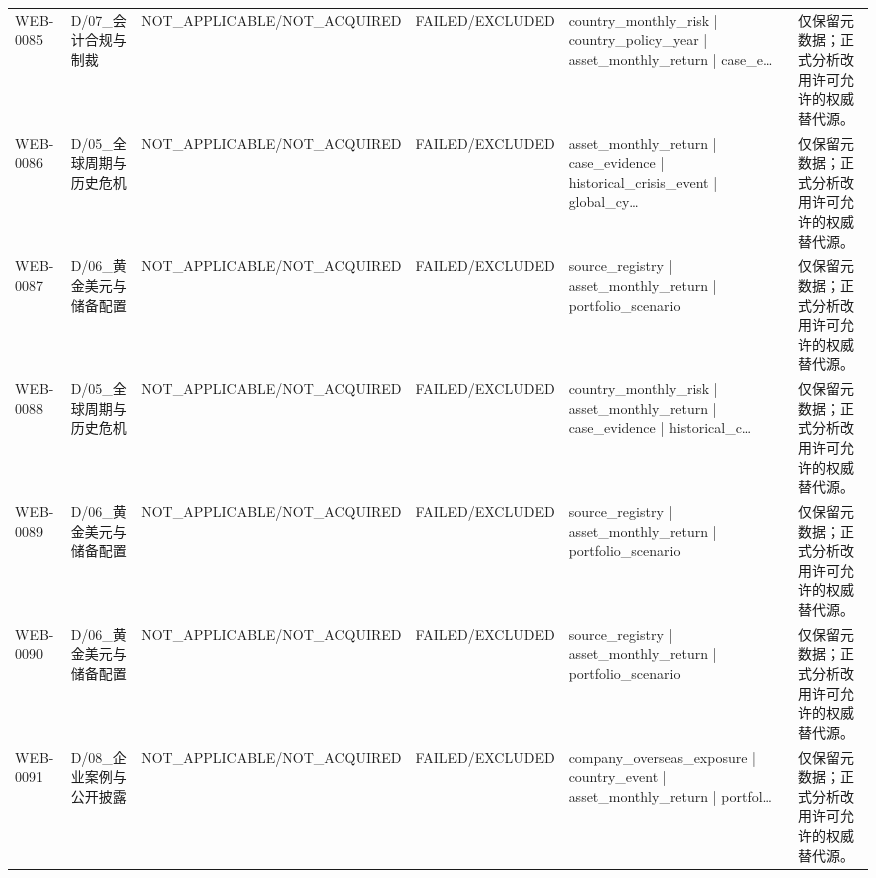 \begin{landscape}
\begin{longtable}{p{1.8cm}p{2.6cm}p{2.6cm}p{2.6cm}p{4.8cm}p{7.2cm}}
WEB-0085 & D/\allowbreak{}07\_\allowbreak{}会计合规与制裁 & NOT\_\allowbreak{}APPLICABLE/\allowbreak{}NOT\_\allowbreak{}ACQUIRED & FAILED/\allowbreak{}EXCLUDED & country\_\allowbreak{}monthly\_\allowbreak{}risk | country\_\allowbreak{}policy\_\allowbreak{}year | asset\_\allowbreak{}monthly\_\allowbreak{}return | case\_\allowbreak{}e… & 仅保留元数据；正式分析改用许可允许的权威替代源。\\
WEB-0086 & D/\allowbreak{}05\_\allowbreak{}全球周期与历史危机 & NOT\_\allowbreak{}APPLICABLE/\allowbreak{}NOT\_\allowbreak{}ACQUIRED & FAILED/\allowbreak{}EXCLUDED & asset\_\allowbreak{}monthly\_\allowbreak{}return | case\_\allowbreak{}evidence | historical\_\allowbreak{}crisis\_\allowbreak{}event | global\_\allowbreak{}cy… & 仅保留元数据；正式分析改用许可允许的权威替代源。\\
WEB-0087 & D/\allowbreak{}06\_\allowbreak{}黄金美元与储备配置 & NOT\_\allowbreak{}APPLICABLE/\allowbreak{}NOT\_\allowbreak{}ACQUIRED & FAILED/\allowbreak{}EXCLUDED & source\_\allowbreak{}registry | asset\_\allowbreak{}monthly\_\allowbreak{}return | portfolio\_\allowbreak{}scenario & 仅保留元数据；正式分析改用许可允许的权威替代源。\\
WEB-0088 & D/\allowbreak{}05\_\allowbreak{}全球周期与历史危机 & NOT\_\allowbreak{}APPLICABLE/\allowbreak{}NOT\_\allowbreak{}ACQUIRED & FAILED/\allowbreak{}EXCLUDED & country\_\allowbreak{}monthly\_\allowbreak{}risk | asset\_\allowbreak{}monthly\_\allowbreak{}return | case\_\allowbreak{}evidence | historical\_\allowbreak{}c… & 仅保留元数据；正式分析改用许可允许的权威替代源。\\
WEB-0089 & D/\allowbreak{}06\_\allowbreak{}黄金美元与储备配置 & NOT\_\allowbreak{}APPLICABLE/\allowbreak{}NOT\_\allowbreak{}ACQUIRED & FAILED/\allowbreak{}EXCLUDED & source\_\allowbreak{}registry | asset\_\allowbreak{}monthly\_\allowbreak{}return | portfolio\_\allowbreak{}scenario & 仅保留元数据；正式分析改用许可允许的权威替代源。\\
WEB-0090 & D/\allowbreak{}06\_\allowbreak{}黄金美元与储备配置 & NOT\_\allowbreak{}APPLICABLE/\allowbreak{}NOT\_\allowbreak{}ACQUIRED & FAILED/\allowbreak{}EXCLUDED & source\_\allowbreak{}registry | asset\_\allowbreak{}monthly\_\allowbreak{}return | portfolio\_\allowbreak{}scenario & 仅保留元数据；正式分析改用许可允许的权威替代源。\\
WEB-0091 & D/\allowbreak{}08\_\allowbreak{}企业案例与公开披露 & NOT\_\allowbreak{}APPLICABLE/\allowbreak{}NOT\_\allowbreak{}ACQUIRED & FAILED/\allowbreak{}EXCLUDED & company\_\allowbreak{}overseas\_\allowbreak{}exposure | country\_\allowbreak{}event | asset\_\allowbreak{}monthly\_\allowbreak{}return | portfol… & 仅保留元数据；正式分析改用许可允许的权威替代源。\\

\end{longtable}
\end{landscape}
